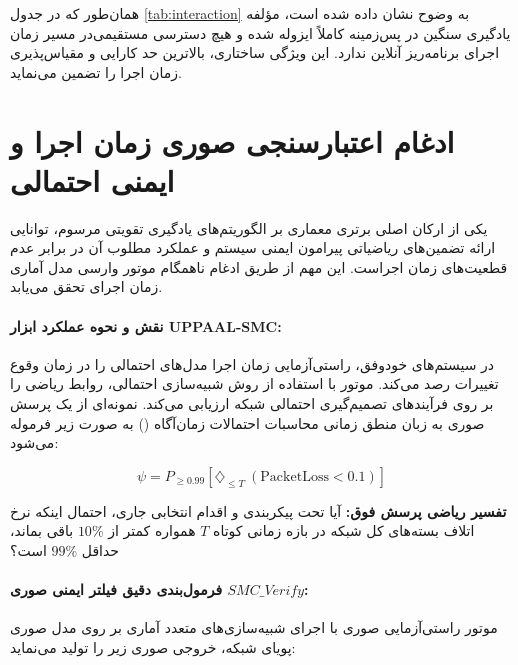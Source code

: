 \documentclass[oneside,openany,phd]{TMU-Thesis}
\begin{document}
همان‌طور که در جدول \ref{tab:interaction} به وضوح نشان داده شده است، مؤلفه یادگیری سنگین در پس‌زمینه کاملاً ایزوله شده و هیچ دسترسی مستقیمی‌در مسیر زمان اجرای برنامه‌ریز آنلاین ندارد. این ویژگی ساختاری، بالاترین حد کارایی و مقیاس‌پذیری زمان اجرا را تضمین می‌نماید.



\section{ادغام اعتبارسنجی صوری زمان اجرا و ایمنی احتمالی}

\label{sec:formal_verification_sec}



یکی از ارکان اصلی برتری معماری  بر الگوریتم‌های یادگیری تقویتی مرسوم، توانایی ارائه تضمین‌های ریاضیاتی پیرامون ایمنی سیستم و عملکرد مطلوب آن در برابر عدم قطعیت‌های زمان اجراست. این مهم از طریق ادغام ناهمگام موتور وارسی مدل آماری زمان اجرای  \cite{david2015uppaal} تحقق می‌یابد.



\paragraph{نقش و نحوه عملکرد ابزار UPPAAL-SMC:}

در سیستم‌های خودوفق، راستی‌آزمایی زمان اجرا مدل‌های احتمالی را در زمان وقوع تغییرات رصد می‌کند. موتور  با استفاده از روش شبیه‌سازی احتمالی، روابط ریاضی را بر روی فرآیندهای تصمیم‌گیری احتمالی شبکه ارزیابی می‌کند. نمونه‌ای از یک پرسش صوری به زبان منطق زمانی محاسبات احتمالات زمان‌آگاه () \cite{hansson1994logic} به صورت زیر فرموله می‌شود:

\begin{equation}
\psi = P_{\geq 0.99} \left[ \diamondsuit_{\leq T} \ (\text{PacketLoss} < 0.1) \right]
\label{eq:pctl_query}
\end{equation}

\textbf{تفسیر ریاضی پرسش فوق:} آیا تحت پیکربندی و اقدام انتخابی جاری، احتمال اینکه نرخ اتلاف بسته‌های کل شبکه در بازه زمانی کوتاه $T$ همواره کمتر از $10\%$ باقی بماند، حداقل $99\%$ است؟



\paragraph{فرمول‌بندی دقیق فیلتر ایمنی صوری $SMC\_Verify$:}

موتور راستی‌آزمایی صوری با اجرای شبیه‌سازی‌های متعدد آماری بر روی مدل صوری پویای شبکه، خروجی صوری زیر را تولید می‌نماید:
\end{document}
